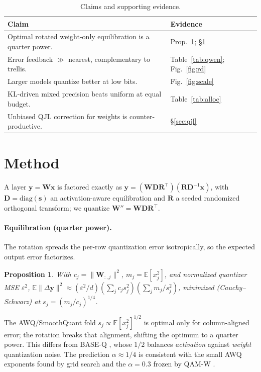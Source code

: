 \documentclass[10pt]{article}
\newtheorem{proposition}{Proposition}
\newcommand{\E}{\mathbb{E}}
\newcommand{\W}{\mathbf{W}}
\newcommand{\x}{\mathbf{x}}
\begin{document}
\begin{table}[htbp]
\centering
\caption{Claims and supporting evidence.}
\label{tab:claims}
\small
\begin{tabular}{p{7.6cm}l}
\toprule
Claim & Evidence \\
\midrule
Optimal rotated weight-only equilibration is a quarter power. & Prop.~\ref{prop:quarter}; \S\ref{sec:method}\\
Error feedback $\gg$ nearest, complementary to trellis. & Table~\ref{tab:qwen}; Fig.~\ref{fig:rd}\\
Larger models quantize better at low bits. & Fig.~\ref{fig:scale}\\
KL-driven mixed precision beats uniform at equal budget. & Table~\ref{tab:alloc}\\
Unbiased QJL correction for weights is counter-productive. & \S\ref{sec:qjl}\\
\bottomrule
\end{tabular}
\end{table}

\section{Method}
\label{sec:method}
A layer $\mathbf y=\W\x$ is factored exactly as
$\mathbf y=(\W\mathbf D\mathbf R^\top)(\mathbf R\mathbf D^{-1}\x)$, with
$\mathbf D=\mathrm{diag}(\mathbf s)$ an activation-aware equilibration and $\mathbf R$ a
seeded randomized orthogonal transform; we quantize $\W''=\W\mathbf D\mathbf R^\top$.

\paragraph{Equilibration (quarter power).} The rotation spreads the per-row
quantization error isotropically, so the expected output error factorizes.
\begin{proposition}\label{prop:quarter}
With $c_j=\lVert\W_{:,j}\rVert^2$, $m_j=\E[x_j^2]$, and normalized quantizer MSE
$\varepsilon^2$,
$\E\lVert\Delta\mathbf y\rVert^2\approx(\varepsilon^2/d)(\sum_j c_j s_j^2)(\sum_j m_j/s_j^2)$,
minimized (Cauchy--Schwarz) at $s_j=(m_j/c_j)^{1/4}$.
\end{proposition}
The AWQ/SmoothQuant fold $s_j\propto\E[x_j^2]^{1/2}$ is optimal only for
column-aligned error; the rotation breaks that alignment, shifting the optimum
to a quarter power. This differs from BASE-Q \citep{he2025baseq}, whose $1/2$
balances \emph{activation} against \emph{weight} quantization noise. The
prediction $\alpha\approx1/4$ is consistent with the small AWQ exponents found by
grid search \citep{lin2024awq} and the $\alpha{=}0.3$ frozen by QAM-W
\citep{sharma2026qamw}.
\end{document}
